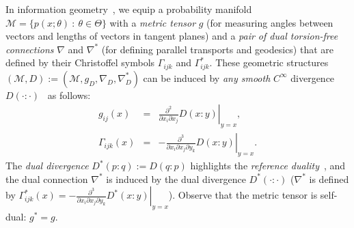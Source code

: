 \documentclass[graybox]{svmult}
\def\eqdef{:=}
\def\calM{\mathcal{M}}
\def\st{{\ :\ }}
\begin{document}
In information geometry~\cite{IG-2014,IG-2016}, we	equip a probability manifold $\calM=\{p(x;\theta)\st \theta\in\Theta\}$ with a {\em metric tensor} $g$ (for measuring angles between vectors and lengths of vectors in tangent planes) and a {\em pair of dual torsion-free connections} $\nabla$ and $\nabla^*$ (for defining parallel transports and geodesics) that are defined by their Christoffel symbols $\Gamma_{ijk}$ and  $\Gamma_{ijk}^*$. 
These geometric structures $(\calM,D)\eqdef (\calM,g_D,\nabla_D,\nabla^*_D)$ can be induced by {\em any smooth} $C^\infty$ divergence $D(\cdot:\cdot)$~\cite{Eguchi-1992,IGDiv-2010,IG-2014,IG-2016} as follows: 
\begin{eqnarray}
	g_{ij}(x)&=& \left. \frac{\partial^2}{\partial x_i\partial x_j} D(x:y)\right\vert_{y=x},\\
	\Gamma_{ijk}(x)&=& \left. -\frac{\partial^3}{\partial x_i\partial x_j\partial y_k} D(x:y)\right\vert_{y=x}.
\end{eqnarray}
The {\em dual  divergence} $D^*(p:q)\eqdef D(q:p)$ highlights the {\em reference duality}~\cite{refduality-2015}, and
the dual connection $\nabla^*$  is induced by the dual divergence $D^*(\cdot:\cdot)$ ($\nabla^*$ is defined by $\Gamma_{ijk}^*(x)=\left. -\frac{\partial^3}{\partial x_i\partial x_j\partial y_k} D^*(x:y)\right\vert_{y=x}$). 
Observe that the metric tensor is self-dual: $g^*=g$.


\end{document}
